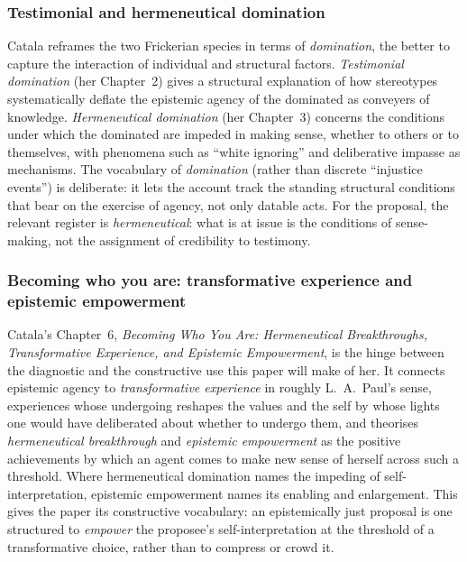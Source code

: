 \documentclass[11pt,a4paper]{article}
\begin{document}
\subsubsection{Testimonial and hermeneutical domination}

Catala reframes the two Frickerian species in terms of \emph{domination}, the better to capture the interaction of individual and structural factors. \emph{Testimonial domination} (her Chapter~2) gives a structural explanation of how stereotypes systematically deflate the epistemic agency of the dominated as conveyers of knowledge. \emph{Hermeneutical domination} (her Chapter~3) concerns the conditions under which the dominated are impeded in making sense, whether to others or to themselves, with phenomena such as ``white ignoring'' and deliberative impasse as mechanisms. The vocabulary of \emph{domination} (rather than discrete ``injustice events'') is deliberate: it lets the account track the standing structural conditions that bear on the exercise of agency, not only datable acts. For the proposal, the relevant register is \emph{hermeneutical}: what is at issue is the conditions of sense-making, not the assignment of credibility to testimony.

\subsubsection{Becoming who you are: transformative experience and epistemic empowerment}

Catala's Chapter~6, \emph{Becoming Who You Are: Hermeneutical Breakthroughs, Transformative Experience, and Epistemic Empowerment}, is the hinge between the diagnostic and the constructive use this paper will make of her. It connects epistemic agency to \emph{transformative experience} in roughly L.~A.\ Paul's sense, experiences whose undergoing reshapes the values and the self by whose lights one would have deliberated about whether to undergo them, and theorises \emph{hermeneutical breakthrough} and \emph{epistemic empowerment} as the positive achievements by which an agent comes to make new sense of herself across such a threshold. Where hermeneutical domination names the impeding of self-interpretation, epistemic empowerment names its enabling and enlargement. This gives the paper its constructive vocabulary: an epistemically just proposal is one structured to \emph{empower} the proposee's self-interpretation at the threshold of a transformative choice, rather than to compress or crowd it.
\end{document}
